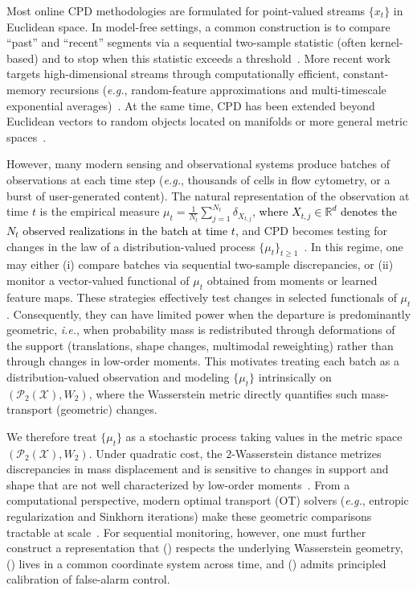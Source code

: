 \documentclass{article}
\newcommand{\ie}{\textit{i.e.}, \xspace}
\newcommand{\eg}{\textit{e.g.}, \xspace}
\newcommand{\rev}[1]{\textcolor{black}{#1}}
\theoremstyle{plain}
\theoremstyle{definition}
\theoremstyle{remark}
\begin{document}
Most online CPD methodologies are formulated for point-valued streams $\{x_t\}$ in Euclidean space.
In model-free settings, a common construction is to compare ``past'' and ``recent'' segments via a sequential two-sample statistic (often kernel-based) and to stop when this statistic exceeds a threshold~\citep{harchaoui2008kernelcpa,li2015mstatistic,chang2019kernel}.
More recent work targets high-dimensional streams through computationally efficient, constant-memory recursions (\eg random-feature approximations and multi-timescale exponential averages)~\citep{keriven2020newma}.
At the same time, CPD has been extended beyond Euclidean vectors to random objects located on manifolds or more general metric spaces~\citep{wang2013locality,bouchard2020riemannian, dubey2020frechet, wang2024non}.

However, many modern sensing and observational systems produce batches of observations at each time step (\eg thousands of cells in flow cytometry, or a burst of user-generated content).
The natural representation of the observation at time $t$ is the empirical measure $\mu_t=\frac1{N_t}\sum_{j=1}^{N_t}\delta_{X_{t,j}}$, \rev{where $X_{t,j} \in \mathbb{R}^d$ denotes the $N_t$ observed realizations in the batch at time $t$,}
and CPD becomes testing for changes in the law of a distribution-valued process $\{\mu_t\}_{t\ge 1}$~\citep{horvath2021monitoring}.
In this regime, one may either (i) compare batches via sequential two-sample discrepancies, or (ii) monitor a vector-valued functional of $\mu_t$ obtained from moments or learned feature maps.
These strategies effectively test changes in selected functionals of $\mu_t$.
Consequently, they can have limited power when the departure is predominantly geometric, \ie when probability mass is redistributed through deformations of the support (translations, shape changes, multimodal reweighting) rather than through changes in low-order moments.
This motivates treating each batch as a distribution-valued observation and modeling $\{\mu_t\}$ intrinsically on $(\mathcal P_2(\mathcal X),W_2)$, where the Wasserstein metric directly quantifies such mass-transport (geometric) changes.

We therefore treat $\{\mu_t\}$ as a stochastic process taking values in the metric space $(\mathcal P_2(\mathcal X),W_2)$.
Under quadratic cost, the $2$-Wasserstein distance metrizes discrepancies in mass displacement and is sensitive to changes in support and shape that are not well characterized by low-order moments~\citep{panaretos2019statistical}.
From a computational perspective, modern optimal transport (OT) solvers (\eg entropic regularization and Sinkhorn iterations) make these geometric comparisons tractable at scale~\citep{cuturi2013sinkhorn}.
For sequential monitoring, however, one must further construct a representation that () respects the underlying Wasserstein geometry, () lives in a common coordinate system across time, and () admits principled calibration of false-alarm control.
\end{document}
